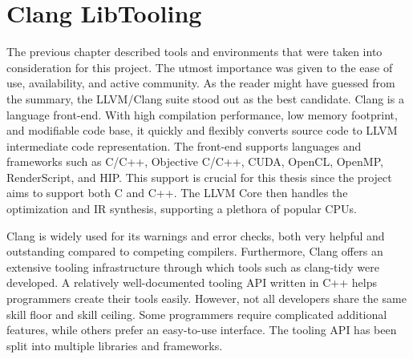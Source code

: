 \chapter{Clang LibTooling}



The previous chapter described tools and environments that were taken
into consideration for this project. 
The utmost importance was given to the ease of use, availability, and 
active community. 
As the reader might have guessed from the summary, the LLVM/Clang 
suite stood out as the best candidate.
Clang is a language front-end. With high compilation performance, 
low memory footprint, and modifiable code base, it quickly and flexibly 
converts source code to LLVM intermediate code representation. 
The front-end supports languages and frameworks such as C/C++, 
Objective C/C++, CUDA, OpenCL, OpenMP, RenderScript, and HIP. 
This support is crucial for this thesis since the project 
aims to support both C and C++. 
The LLVM Core then handles the optimization and IR synthesis, 
supporting a plethora of popular CPUs.

Clang is widely used for its warnings and error checks, both very 
helpful and outstanding compared to competing compilers. 
Furthermore, Clang offers an extensive tooling infrastructure 
through which tools such as clang-tidy were developed. 
A relatively well-documented tooling API written in C++ helps 
programmers create their tools easily. 
However, not all developers share the same skill floor and skill ceiling. 
Some programmers require complicated additional features, while others 
prefer an easy-to-use interface. 
The tooling API has been split into multiple libraries and frameworks. 

